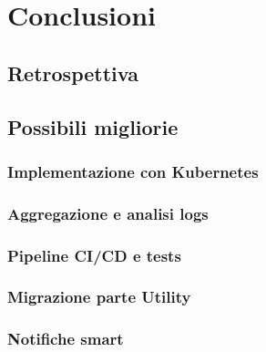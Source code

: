 \chapter{Conclusioni}
\label{cha:conclusioni}

\section{Retrospettiva}
\label{sec:retrospettiva}

\lipsum[1]

\section{Possibili migliorie}
\label{sec:migliorie}

\subsection{Implementazione con Kubernetes}
\label{sub:kubernetes}

\lipsum[1]

\subsection{Aggregazione e analisi logs}
\label{sub:logs}

\lipsum[1]

\subsection{Pipeline CI/CD e tests}
\label{sub:tests}

\lipsum[1]

\subsection{Migrazione parte Utility}
\label{sub:utility}

\lipsum[1]

\subsection{Notifiche smart}
\label{sub:notifiche}

\lipsum[1]